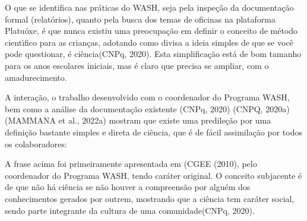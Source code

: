 \documentclass[
12pt,		%
openright,	%
twoside,  %
a4paper,			%
chapter=TITLE,		%
english,			%
french,				%
spanish,			%
brazil				%
]{USPSC-classe/USPSC}
\begin{document}
O que se identifica nas pr\'aticas do WASH, seja pela inspe\c{c}\~ao da documenta\c{c}\~ao formal (relat\'orios), quanto pela busca dos temas de oficinas na plataforma \textquotedbl Platu\'oxe\textquotedbl , \'e que nunca existiu uma preocupa\c{c}\~ao em definir o conceito de m\'etodo cient\'{\i}fico para as crian\c{c}as, adotando como \textquotedbl divisa \textquotedbl  a ideia simples de que \textquotedbl se voc\^e pode questionar, \'e ci\^encia\textquotedbl  (CNPq, 2020). Esta simplifica\c{c}\~ao est\'a de bom tamanho para os anos escolares iniciais, mas \'e claro que precisa se ampliar, com o amadurecimento.

















A intera\c{c}\~ao, o trabalho desenvolvido com o coordenador do Programa WASH, bem como a an\'alise da documenta\c{c}\~ao existente (CNPq, 2020)  (CNPQ, 2020a)  (MAMMANA et al., 2022a) mostram que existe uma predile\c{c}\~ao por uma defini\c{c}\~ao bastante simples e direta de ci\^encia, que \'e de f\'acil assimila\c{c}\~ao por todos os colaboradores:


















\noindent\begin{center}\mbox{\centering{}}\end{center}


A frase acima foi primeiramente apresentada em (CGEE (2010), pelo coordenador do Programa WASH, tendo car\'ater original. O conceito subjacente \'e de que \textquotedbl n\~ao h\'a ci\^encia se n\~ao houver a compreens\~ao por algu\'em dos conhecimentos gerados por outrem, mostrando que a ci\^encia tem car\'ater social, sendo parte integrante da cultura de uma comunidade\textquotedbl  (CNPq, 2020).
\end{document}
